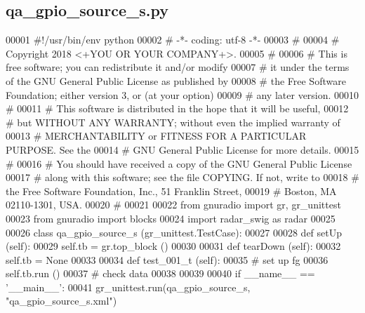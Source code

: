 \subsection{qa\+\_\+gpio\+\_\+source\+\_\+s.\+py}
\label{qa__gpio__source__s_8py_source}

\begin{DoxyCode}
00001 \textcolor{comment}{#!/usr/bin/env python}
00002 \textcolor{comment}{# -*- coding: utf-8 -*-}
00003 \textcolor{comment}{# }
00004 \textcolor{comment}{# Copyright 2018 <+YOU OR YOUR COMPANY+>.}
00005 \textcolor{comment}{# }
00006 \textcolor{comment}{# This is free software; you can redistribute it and/or modify}
00007 \textcolor{comment}{# it under the terms of the GNU General Public License as published by}
00008 \textcolor{comment}{# the Free Software Foundation; either version 3, or (at your option)}
00009 \textcolor{comment}{# any later version.}
00010 \textcolor{comment}{# }
00011 \textcolor{comment}{# This software is distributed in the hope that it will be useful,}
00012 \textcolor{comment}{# but WITHOUT ANY WARRANTY; without even the implied warranty of}
00013 \textcolor{comment}{# MERCHANTABILITY or FITNESS FOR A PARTICULAR PURPOSE.  See the}
00014 \textcolor{comment}{# GNU General Public License for more details.}
00015 \textcolor{comment}{# }
00016 \textcolor{comment}{# You should have received a copy of the GNU General Public License}
00017 \textcolor{comment}{# along with this software; see the file COPYING.  If not, write to}
00018 \textcolor{comment}{# the Free Software Foundation, Inc., 51 Franklin Street,}
00019 \textcolor{comment}{# Boston, MA 02110-1301, USA.}
00020 \textcolor{comment}{# }
00021 
00022 \textcolor{keyword}{from} gnuradio \textcolor{keyword}{import} gr, gr\_unittest
00023 \textcolor{keyword}{from} gnuradio \textcolor{keyword}{import} blocks
00024 \textcolor{keyword}{import} radar\_swig \textcolor{keyword}{as} radar
00025 
00026 \textcolor{keyword}{class }qa_gpio_source_s (gr\_unittest.TestCase):
00027 
00028     \textcolor{keyword}{def }setUp (self):
00029         self.tb = gr.top\_block ()
00030 
00031     \textcolor{keyword}{def }tearDown (self):
00032         self.tb = \textcolor{keywordtype}{None}
00033 
00034     \textcolor{keyword}{def }test_001_t (self):
00035         \textcolor{comment}{# set up fg}
00036         self.tb.run ()
00037         \textcolor{comment}{# check data}
00038 
00039 
00040 \textcolor{keywordflow}{if} \_\_name\_\_ == \textcolor{stringliteral}{'\_\_main\_\_'}:
00041     gr\_unittest.run(qa\_gpio\_source\_s, \textcolor{stringliteral}{"qa\_gpio\_source\_s.xml"})
\end{DoxyCode}
